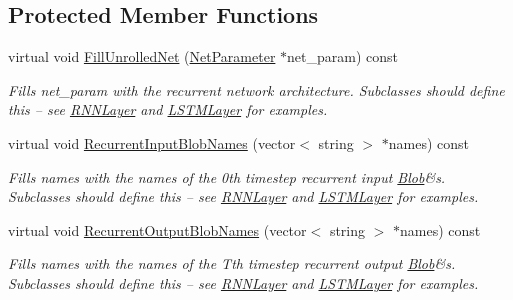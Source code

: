 \subsection*{Protected Member Functions}
\begin{DoxyCompactItemize}
\item 
\mbox{\label{classcaffe_1_1_r_n_n_layer_a2869101eb6b9c472f9d78b9149246729}} 
virtual void \mbox{\hyperlink{classcaffe_1_1_r_n_n_layer_a2869101eb6b9c472f9d78b9149246729}{Fill\+Unrolled\+Net}} (\mbox{\hyperlink{classcaffe_1_1_net_parameter}{Net\+Parameter}} $\ast$net\+\_\+param) const
\begin{DoxyCompactList}\small\item\em Fills net\+\_\+param with the recurrent network architecture. Subclasses should define this -- see \mbox{\hyperlink{classcaffe_1_1_r_n_n_layer}{R\+N\+N\+Layer}} and \mbox{\hyperlink{classcaffe_1_1_l_s_t_m_layer}{L\+S\+T\+M\+Layer}} for examples. \end{DoxyCompactList}\item 
\mbox{\label{classcaffe_1_1_r_n_n_layer_a1d753540adb5718db6b66e0aa2c0c4fb}} 
virtual void \mbox{\hyperlink{classcaffe_1_1_r_n_n_layer_a1d753540adb5718db6b66e0aa2c0c4fb}{Recurrent\+Input\+Blob\+Names}} (vector$<$ string $>$ $\ast$names) const
\begin{DoxyCompactList}\small\item\em Fills names with the names of the 0th timestep recurrent input \mbox{\hyperlink{classcaffe_1_1_blob}{Blob}}\&s. Subclasses should define this -- see \mbox{\hyperlink{classcaffe_1_1_r_n_n_layer}{R\+N\+N\+Layer}} and \mbox{\hyperlink{classcaffe_1_1_l_s_t_m_layer}{L\+S\+T\+M\+Layer}} for examples. \end{DoxyCompactList}\item 
\mbox{\label{classcaffe_1_1_r_n_n_layer_a57d105b9599c294d05fe25b8542e1031}} 
virtual void \mbox{\hyperlink{classcaffe_1_1_r_n_n_layer_a57d105b9599c294d05fe25b8542e1031}{Recurrent\+Output\+Blob\+Names}} (vector$<$ string $>$ $\ast$names) const
\begin{DoxyCompactList}\small\item\em Fills names with the names of the Tth timestep recurrent output \mbox{\hyperlink{classcaffe_1_1_blob}{Blob}}\&s. Subclasses should define this -- see \mbox{\hyperlink{classcaffe_1_1_r_n_n_layer}{R\+N\+N\+Layer}} and \mbox{\hyperlink{classcaffe_1_1_l_s_t_m_layer}{L\+S\+T\+M\+Layer}} for examples. \end{DoxyCompactList}\item 

\end{DoxyCompactItemize}
